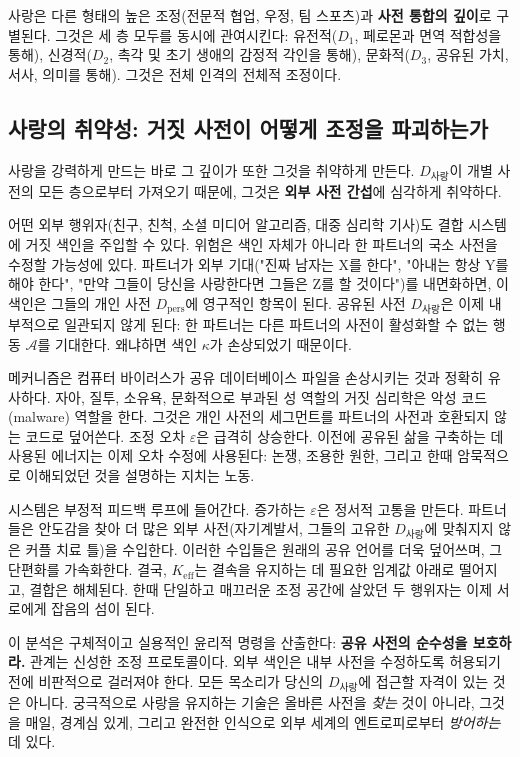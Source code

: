 \documentclass[12pt,a4paper]{article}
\begin{document}
	사랑은 다른 형태의 높은 조정(전문적 협업, 우정, 팀 스포츠)과 \textbf{사전 통합의 깊이}로 구별된다. 그것은 세 층 모두를 동시에 관여시킨다: 유전적(\(D_1\), 페로몬과 면역 적합성을 통해), 신경적(\(D_2\), 촉각 및 초기 생애의 감정적 각인을 통해), 문화적(\(D_3\), 공유된 가치, 서사, 의미를 통해). 그것은 전체 인격의 전체적 조정이다.
	
	\subsection{사랑의 취약성: 거짓 사전이 어떻게 조정을 파괴하는가}
	
	사랑을 강력하게 만드는 바로 그 깊이가 또한 그것을 취약하게 만든다. \(D_{\text{사랑}}\)이 개별 사전의 모든 층으로부터 가져오기 때문에, 그것은 \textbf{외부 사전 간섭}에 심각하게 취약하다.
	
	어떤 외부 행위자(친구, 친척, 소셜 미디어 알고리즘, 대중 심리학 기사)도 결합 시스템에 거짓 색인을 주입할 수 있다. 위험은 색인 자체가 아니라 한 파트너의 국소 사전을 수정할 가능성에 있다. 파트너가 외부 기대("진짜 남자는 X를 한다", "아내는 항상 Y를 해야 한다", "만약 그들이 당신을 사랑한다면 그들은 Z를 할 것이다")를 내면화하면, 이 색인은 그들의 개인 사전 \(D_{\text{pers}}\)에 영구적인 항목이 된다. 공유된 사전 \(D_{\text{사랑}}\)은 이제 내부적으로 일관되지 않게 된다: 한 파트너는 다른 파트너의 사전이 활성화할 수 없는 행동 \(\mathcal{A}\)를 기대한다. 왜냐하면 색인 \(\kappa\)가 손상되었기 때문이다.
	
	메커니즘은 컴퓨터 바이러스가 공유 데이터베이스 파일을 손상시키는 것과 정확히 유사하다. 자아, 질투, 소유욕, 문화적으로 부과된 성 역할의 거짓 심리학은 악성 코드(malware) 역할을 한다. 그것은 개인 사전의 세그먼트를 파트너의 사전과 호환되지 않는 코드로 덮어쓴다. 조정 오차 \(\varepsilon\)은 급격히 상승한다. 이전에 공유된 삶을 구축하는 데 사용된 에너지는 이제 오차 수정에 사용된다: 논쟁, 조용한 원한, 그리고 한때 암묵적으로 이해되었던 것을 설명하는 지치는 노동.
	
	시스템은 부정적 피드백 루프에 들어간다. 증가하는 \(\varepsilon\)은 정서적 고통을 만든다. 파트너들은 안도감을 찾아 더 많은 외부 사전(자기계발서, 그들의 고유한 \(D_{\text{사랑}}\)에 맞춰지지 않은 커플 치료 틀)을 수입한다. 이러한 수입들은 원래의 공유 언어를 더욱 덮어쓰며, 그 단편화를 가속화한다. 결국, \(K_{\mathrm{eff}}\)는 결속을 유지하는 데 필요한 임계값 아래로 떨어지고, 결합은 해체된다. 한때 단일하고 매끄러운 조정 공간에 살았던 두 행위자는 이제 서로에게 잡음의 섬이 된다.
	
	이 분석은 구체적이고 실용적인 윤리적 명령을 산출한다: \textbf{공유 사전의 순수성을 보호하라.} 관계는 신성한 조정 프로토콜이다. 외부 색인은 내부 사전을 수정하도록 허용되기 전에 비판적으로 걸러져야 한다. 모든 목소리가 당신의 \(D_{\text{사랑}}\)에 접근할 자격이 있는 것은 아니다. 궁극적으로 사랑을 유지하는 기술은 올바른 사전을 \emph{찾는} 것이 아니라, 그것을 매일, 경계심 있게, 그리고 완전한 인식으로 외부 세계의 엔트로피로부터 \emph{방어하는} 데 있다.
	
\end{document}
